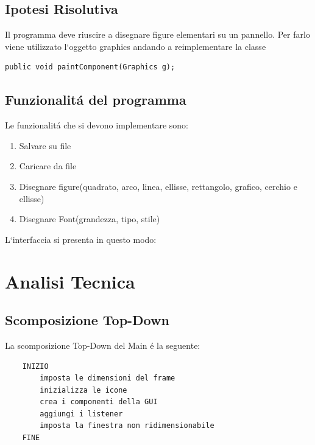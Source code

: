 \documentclass[a4paper,12pt,times,numbered,print,index]{article}
\begin{document}
\subsection{Ipotesi Risolutiva}
Il programma deve riuscire a disegnare figure elementari su un pannello. Per farlo viene utilizzato l`oggetto graphics andando a reimplementare la classe 
\begin{lstlisting}
public void paintComponent(Graphics g);
\end{lstlisting}

\subsection{Funzionalitá del programma}
Le funzionalitá che si devono implementare sono:
\begin{enumerate}
	\item Salvare su file
	\item Caricare da file
	\item Disegnare figure(quadrato, arco, linea, ellisse, rettangolo, grafico, cerchio e ellisse)
	\item Disegnare Font(grandezza, tipo,  stile)
\end{enumerate}


L`interfaccia si presenta in questo modo:


\section{Analisi Tecnica}

\subsection{Scomposizione Top-Down} \label{TopDown}
La scomposizione Top-Down del Main é la seguente:
\begin{lstlisting}
	INIZIO
		imposta le dimensioni del frame
		inizializza le icone
		crea i componenti della GUI
		aggiungi i listener
		imposta la finestra non ridimensionabile
	FINE
\end{lstlisting}
\end{document}
